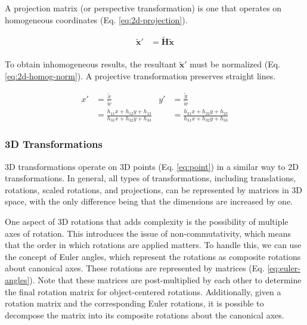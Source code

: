 A projection matrix (or perspective transformation) is one that operates on homogeneous coordinates (Eq. \ref{eq:2d-projection}).

\begin{equation}
    \begin{aligned}
        \tilde{\mathbf{x}}' &= \tilde{\mathbf{H}}\tilde{\mathbf{x}}\\
    \end{aligned}
    \label{eq:2d-projection}
\end{equation}

To obtain inhomogeneous results, the resultant $\tilde{\mathbf{x}}'$ must be normalized (Eq. \ref{eq:2d-homog-norm}). A projective transformation preserves straight lines.

\begin{equation}
    \begin{aligned}
        x'&= \frac{\tilde{x}}{\tilde{w}}  &  y' &= \frac{\tilde{y}}{\tilde{w}}\\
        &= \frac{h_{11}x + h_{12}y + h_{13}}{h_{31}x + h_{32}y + h_{33}} &  &= \frac{h_{21}x + h_{22}y + h_{23}}{h_{31}x + h_{32}y + h_{33}}
    \end{aligned}
    \label{eq:2d-homog-norm}
\end{equation}

\subsubsection{3D Transformations}

3D transformations operate on 3D points (Eq. \ref{eq:point}) in a similar way to 2D transformations. In general, all types of transformations, including translations, rotations, scaled rotations, and projections, can be represented by matrices in 3D space, with the only difference being that the dimensions are increased by one.

One aspect of 3D rotations that adds complexity is the possibility of multiple axes of rotation. This introduces the issue of non-commutativity, which means that the order in which rotations are applied matters. To handle this, we can use the concept of Euler angles, which represent the rotations as composite rotations about canonical axes. These rotations are represented by matrices (Eq. \ref{eq:euler-angles}). Note that these matrices are post-multiplied by each other to determine the final rotation matrix for object-centered rotations. Additionally, given a rotation matrix and the corresponding Euler rotations, it is possible to decompose the matrix into its composite rotations about the canonical axes.

